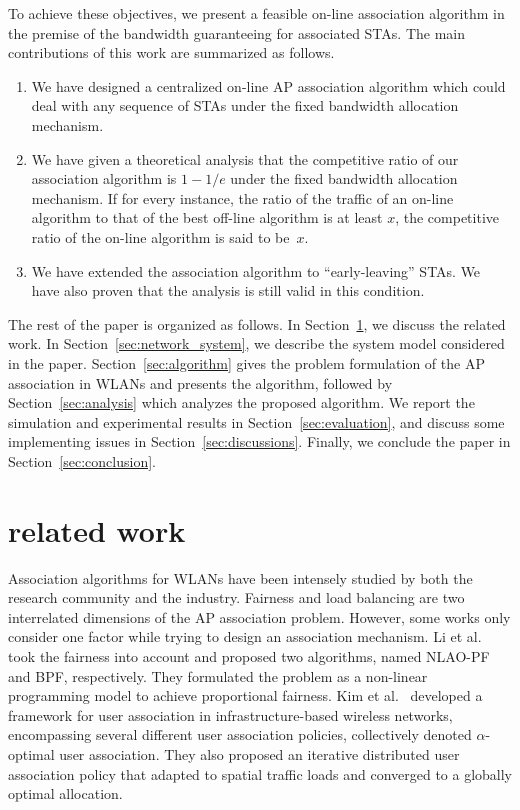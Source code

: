 \documentclass[conference]{IEEEtran}
\begin{document}
  To achieve these objectives, we present a feasible on-line association algorithm in the premise of the bandwidth guaranteeing for associated STAs.  The main contributions of this work are summarized as follows.
  \begin{enumerate}
    \item We have designed a centralized on-line AP association algorithm which could deal with any sequence of STAs under the fixed bandwidth allocation mechanism.
    \item We have given a theoretical analysis that the competitive ratio of our association algorithm is $1-1/e$ under the fixed bandwidth allocation mechanism.  If for every instance, the ratio of the traffic of an on-line algorithm to that of the best off-line algorithm is at least $x$, the competitive ratio of the on-line algorithm is said to be~$x$.
    \item We have extended the association algorithm to ``early-leaving'' STAs.  We have also proven that the analysis is still valid in this condition.
  \end{enumerate}

    The rest of the paper is organized as follows. In Section~\ref{sec:related_work}, we discuss the related work. In Section~\ref{sec:network_system}, we describe the system model considered in the paper. Section~\ref{sec:algorithm} gives the problem formulation of the AP association in WLANs and presents the algorithm, followed by Section~\ref{sec:analysis} which analyzes the proposed algorithm.  We report the simulation and experimental results in Section~\ref{sec:evaluation}, and discuss some implementing issues in Section~\ref{sec:discussions}.  Finally, we conclude the paper in Section~\ref{sec:conclusion}.


\section{related work}\label{sec:related_work}
  Association algorithms for WLANs have been intensely studied by both the research community and the industry.  Fairness and load balancing are two interrelated dimensions of the AP association problem.  However, some works only consider one factor while trying to design an association mechanism. Li et al.~\cite{li2012ap} took the fairness into account and proposed two algorithms, named NLAO-PF and BPF, respectively. They formulated the problem as a non-linear programming model to achieve proportional fairness. Kim et al.~\cite{kim2012distributed} developed a framework for user association in infrastructure-based wireless networks, encompassing several different user association policies, collectively denoted $\alpha$-optimal user association. They also proposed an iterative distributed user association policy that adapted to spatial traffic loads and converged to a globally optimal allocation.
\end{document}
